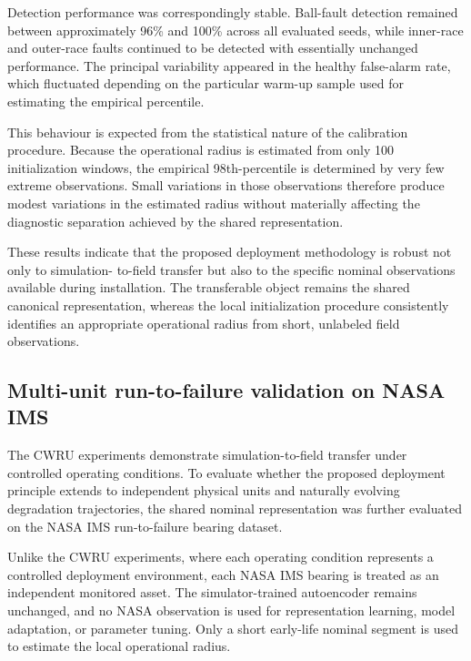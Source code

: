 \documentclass[11pt,a4paper]{article}
\begin{document}
Detection performance was correspondingly stable. Ball-fault detection remained between
approximately 96\% and 100\% across all evaluated seeds, while inner-race and outer-race faults
continued to be detected with essentially unchanged performance. The principal variability
appeared in the healthy false-alarm rate, which fluctuated depending on the particular warm-up
sample used for estimating the empirical percentile.

This behaviour is expected from the statistical nature of the calibration procedure. Because the
operational radius is estimated from only 100 initialization windows, the empirical
98th-percentile is determined by very few extreme observations. Small variations in those
observations therefore produce modest variations in the estimated radius without materially
affecting the diagnostic separation achieved by the shared representation.

These results indicate that the proposed deployment methodology is robust not only to simulation-
to-field transfer but also to the specific nominal observations available during installation.
The transferable object remains the shared canonical representation, whereas the local
initialization procedure consistently identifies an appropriate operational radius from short,
unlabeled field observations.

\subsection{Multi-unit run-to-failure validation on NASA IMS}
\label{sec:nasa-results}

The CWRU experiments demonstrate simulation-to-field transfer under
controlled operating conditions. To evaluate whether the proposed
deployment principle extends to independent physical units and naturally
evolving degradation trajectories, the shared nominal representation was
further evaluated on the NASA IMS run-to-failure bearing dataset.

Unlike the CWRU experiments, where each operating condition represents a
controlled deployment environment, each NASA IMS bearing is treated as an
independent monitored asset. The simulator-trained autoencoder remains
unchanged, and no NASA observation is used for representation learning,
model adaptation, or parameter tuning. Only a short early-life nominal
segment is used to estimate the local operational radius.
\end{document}
